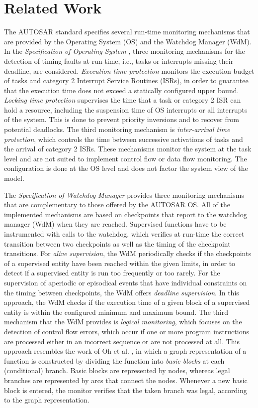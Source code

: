 \section{Related Work}
\label{sec:relatedWork}

The AUTOSAR standard specifies several run-time monitoring mechanisms that are provided by the Operating System (OS) and the Watchdog Manager (WdM).
In the \emph{Specification of Operating System} \cite{AUTOSAR_OS_SPEC}, three monitoring mechanisms for the detection of timing faults at run-time, i.e., tasks or interrupts missing their deadline, are considered.
\emph{Execution time protection} monitors the execution budget of tasks and category 2 Interrupt Service Routines (ISRs), in order to guarantee that the execution time does not exceed a statically configured upper bound.
\emph{Locking time protection} supervises the time that a task or category 2 ISR can hold a resource, including the suspension time of OS interrupts or all interrupts of the system.
This is done to prevent priority inversions and to recover from potential deadlocks.
The third monitoring mechanism is \emph{inter-arrival time protection}, which controls the time between successive activations of tasks and the arrival of category 2 ISRs.
These mechanisms monitor the system at the task level and are not suited to implement control flow or data flow monitoring.
The configuration is done at the OS level and does not factor the system view of the model.

The \emph{Specification of Watchdog Manager} \cite{AUTOSAR_WDM_SPEC} provides three monitoring mechanisms that are complementary to those offered by the AUTOSAR OS.
All of the implemented mechanisms are based on checkpoints that report to the watchdog manager (WdM) when they are reached.
Supervised functions have to be instrumented with calls to the watchdog, which verifies at run-time the correct transition between two checkpoints as well as the timing of the checkpoint transitions.
For \emph{alive supervision}, the WdM periodically checks if the checkpoints of a supervised entity have been reached within the given limits, in order to detect if a supervised entity is run too frequently or too rarely.
For the supervision of aperiodic or episodical events that have individual constraints on the timing between checkpoints, the WdM offers \emph{deadline supervision}.
In this approach, the WdM checks if the execution time of a given block of a supervised entity is within the configured minimum and maximum bound.
The third mechanism that the WdM provides is \emph{logical monitoring}, which focuses on the detection of control flow errors, which occur if one or more program instructions are processed either in an incorrect sequence or are not processed at all.
This approach resembles the work of Oh et al. \cite{Oh2002}, in which a graph representation of a function is constructed by dividing the function into \emph{basic blocks} at each (conditional) branch.
Basic blocks are represented by nodes, whereas legal branches are represented by arcs that connect the nodes. 
Whenever a new basic block is entered, the monitor verifies that the taken branch was legal, according to the graph representation.

